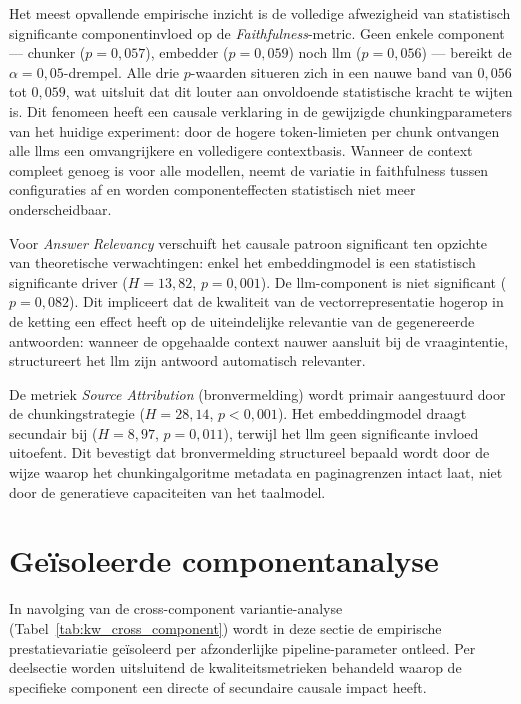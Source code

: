 Het meest opvallende empirische inzicht is de volledige afwezigheid van statistisch significante componentinvloed op de \textit{Faithfulness}-metric. Geen enkele component — chunker ($p = 0{,}057$), embedder ($p = 0{,}059$) noch \gls{llm} ($p = 0{,}056$) — bereikt de $\alpha = 0{,}05$-drempel. Alle drie $p$-waarden situeren zich in een nauwe band van $0{,}056$ tot $0{,}059$, wat uitsluit dat dit louter aan onvoldoende statistische kracht te wijten is. Dit fenomeen heeft een causale verklaring in de gewijzigde chunkingparameters van het huidige experiment: door de hogere token-limieten per chunk ontvangen alle \glspl{llm} een omvangrijkere en volledigere contextbasis. Wanneer de context compleet genoeg is voor alle modellen, neemt de variatie in faithfulness tussen configuraties af en worden componenteffecten statistisch niet meer onderscheidbaar.

Voor \textit{Answer Relevancy} verschuift het causale patroon significant ten opzichte van theoretische verwachtingen: enkel het embeddingmodel is een statistisch significante driver ($H = 13{,}82$, $p = 0{,}001$). De \gls{llm}-component is niet significant ($p = 0{,}082$). Dit impliceert dat de kwaliteit van de vectorrepresentatie hogerop in de ketting een effect heeft op de uiteindelijke relevantie van de gegenereerde antwoorden: wanneer de opgehaalde context nauwer aansluit bij de vraagintentie, structureert het \gls{llm} zijn antwoord automatisch relevanter.

De metriek \textit{Source Attribution} (bronvermelding) wordt primair aangestuurd door de chunkingstrategie ($H = 28{,}14$, $p < 0{,}001$). Het embeddingmodel draagt secundair bij ($H = 8{,}97$, $p = 0{,}011$), terwijl het \gls{llm} geen significante invloed uitoefent. Dit bevestigt dat bronvermelding structureel bepaald wordt door de wijze waarop het chunkingalgoritme metadata en paginagrenzen intact laat, niet door de generatieve capaciteiten van het taalmodel.

\section{Geïsoleerde componentanalyse}
\label{sec:geïsoleerde-componentanalyse}

In navolging van de cross-component variantie-analyse (Tabel~\ref{tab:kw_cross_component}) wordt in deze sectie de empirische prestatievariatie geïsoleerd per afzonderlijke pipeline-parameter ontleed. Per deelsectie worden uitsluitend de kwaliteitsmetrieken behandeld waarop de specifieke component een directe of secundaire causale impact heeft.

